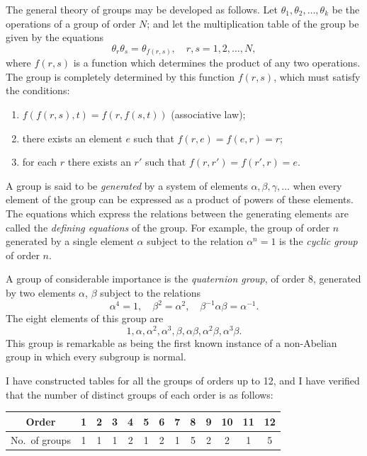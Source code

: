 \documentclass[11pt,a4paper]{book}
\begin{document}
\setcounter{page}{90}

The general theory of groups may be developed as follows. Let $\theta_1, \theta_2, \ldots, \theta_k$ be the operations of a group of order $N$; and let the multiplication table of the group be given by the equations
\[
\theta_r \theta_s = \theta_{f(r,s)}, \quad r,s = 1,2,\ldots,N,
\]
where $f(r,s)$ is a function which determines the product of any two operations. The group is completely determined by this function $f(r,s)$, which must satisfy the conditions:
\begin{enumerate}[label=(\roman*)]
\item $f(f(r,s),t) = f(r,f(s,t))$ (associative law);
\item there exists an element $e$ such that $f(r,e)=f(e,r)=r$;
\item for each $r$ there exists an $r'$ such that $f(r,r')=f(r',r)=e$.
\end{enumerate}

\setcounter{page}{91}

A group is said to be \textit{generated} by a system of elements $\alpha, \beta, \gamma, \ldots$ when every element of the group can be expressed as a product of powers of these elements. The equations which express the relations between the generating elements are called the \textit{defining equations} of the group. For example, the group of order $n$ generated by a single element $\alpha$ subject to the relation $\alpha^n = 1$ is the \textit{cyclic group} of order $n$.

A group of considerable importance is the \textit{quaternion group}, of order 8, generated by two elements $\alpha$, $\beta$ subject to the relations
\[
\alpha^4 = 1, \quad \beta^2 = \alpha^2, \quad \beta^{-1}\alpha\beta = \alpha^{-1}.
\]
The eight elements of this group are
\[
1, \alpha, \alpha^2, \alpha^3, \beta, \alpha\beta, \alpha^2\beta, \alpha^3\beta.
\]
This group is remarkable as being the first known instance of a non-Abelian group in which every subgroup is normal.

\setcounter{page}{92}

I have constructed tables for all the groups of orders up to 12, and I have verified that the number of distinct groups of each order is as follows:

\begin{center}
\begin{tabular}{c|cccccccccccc}
\toprule
Order & 1 & 2 & 3 & 4 & 5 & 6 & 7 & 8 & 9 & 10 & 11 & 12 \\
\midrule
No.\ of groups & 1 & 1 & 1 & 2 & 1 & 2 & 1 & 5 & 2 & 2 & 1 & 5 \\
\bottomrule
\end{tabular}
\end{center}
\end{document}
